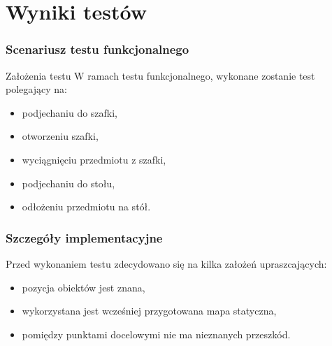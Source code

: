 \section{Wyniki testów}

\begin{frame}
	\frametitle{Scenariusz testu funkcjonalnego}
	\begin{block}{Założenia testu}
		W ramach testu funkcjonalnego, wykonane zostanie test polegający na:
		\begin{itemize}
			\item podjechaniu do szafki,
			\item otworzeniu szafki,
			\item wyciągnięciu przedmiotu z szafki,
			\item podjechaniu do stołu,
			\item odłożeniu przedmiotu na stół.
		\end{itemize}
	\end{block}
\end{frame}

\begin{frame}
	\frametitle{Szczegóły implementacyjne}
	Przed wykonaniem testu zdecydowano się na kilka założeń upraszcających:
	\begin{itemize}
		\item pozycja obiektów jest znana,
		\item wykorzystana jest wcześniej przygotowana mapa statyczna,
		\item pomiędzy punktami docelowymi nie ma nieznanych przeszkód.
	\end{itemize}
\end{frame}

